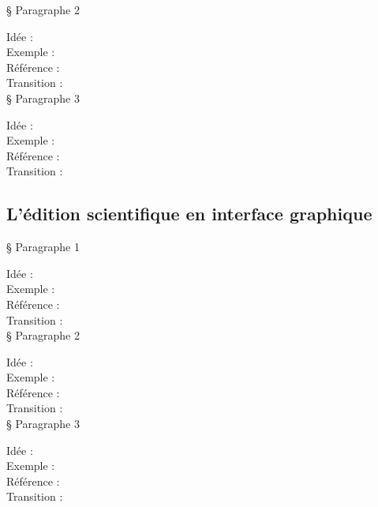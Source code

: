 § Paragraphe 2

Idée :\\
Exemple :\\
Référence :\\
Transition :\\

§ Paragraphe 3

Idée :\\
Exemple :\\
Référence :\\
Transition :\\

\subsection{L’édition scientifique en interface graphique}

§ Paragraphe 1

Idée :\\
Exemple :\\
Référence :\\
Transition :\\

§ Paragraphe 2

Idée :\\
Exemple :\\
Référence :\\
Transition :\\

§ Paragraphe 3

Idée :\\
Exemple :\\
Référence :\\
Transition :\\


